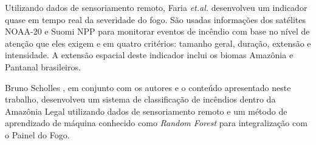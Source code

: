 Utilizando dados de sensoriamento remoto, Faria \textit{et.al.} \cite{severidade-do-fogo} desenvolveu um indicador quase em tempo real da severidade do fogo. São usadas informações dos satélites NOAA-20 e Suomi NPP para monitorar eventos de incêndio com base no nível de atenção que eles exigem e em quatro critérios: tamanho geral, duração, extensão e intensidade. A extensão espacial deste indicador inclui os biomas Amazônia e Pantanal brasileiros.

Bruno Scholles \cite{BrunoScholess2023}, em conjunto com os autores e o conteúdo apresentado neste trabalho, desenvolveu um sistema de classificação de incêndios dentro da Amazônia Legal utilizando dados de sensoriamento remoto e um método de aprendizado de máquina conhecido como \textit{Random Forest} para integralização com o Painel do Fogo.


